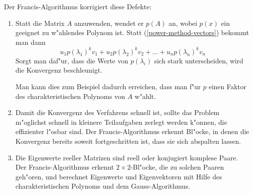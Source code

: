 Der Francis-Algorithmus korrigiert diese Defekte:
\begin{enumerate}
\item
Statt die Matrix $A$ anzuwenden, wendet er $p(A)$ an, wobei
$p(x)$ ein geeignet zu w"ahlendes Polynom ist. Statt
(\ref{power-method-vectors}) bekommt man dann
\[
u_1p(\lambda_1)^kv_1+u_2p(\lambda_2)^kv_2+\dots+u_np(\lambda_n)^kv_n
\]
Sorgt man daf"ur, dass die Werte von $p(\lambda_i)$ sich stark
unterscheiden, wird die Konvergenz beschleunigt.

Man kann dies zum
Beispiel dadurch erreichen, dass man f"ur $p$ einen Faktor des
charakteristischen Polynoms von $A$ w"ahlt. 
\item 
Damit die Konvergenz des Verfahrens schnell ist, sollte das Problem
m"oglichst schnell in kleinere Teilaufgaben zerlegt werden k"onnen,
die effizienter l"osbar sind. Der Francis-Algorithmus erkennt 
Bl"ocke, in denen die Konvergenz bereits soweit fortgeschritten
ist, dass sie sich abspalten lassen.
\item
Die Eigenwerte reeller Matrizen sind reell oder konjugiert komplese
Paare. Der Francis-Algorithmus erkennt $2\times 2$-Bl"ocke, die zu
solchen Paaren geh"oren, und berechnet Eigenwerte und Eigenvektoren
mit Hilfe des charakteristischen Polynoms und dem Gauss-Algorithmus.
\end{enumerate}
